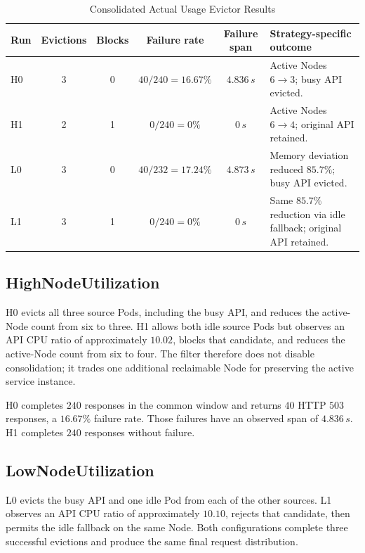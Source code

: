 \begin{table}[t]
    \centering
    \caption{Consolidated Actual Usage Evictor Results}
    \label{tab:consolidated_results}
    \small
    \renewcommand{\arraystretch}{1.18}
    \begin{tabular}{@{}lccccp{6.0cm}@{}}
        \toprule
        \textbf{Run} & \textbf{Evictions} & \textbf{Blocks} &
        \textbf{Failure rate} & \textbf{Failure span} &
        \textbf{Strategy-specific outcome} \\
        \midrule
        H0 & 3 & 0 & \(40/240=16.67\%\) & \(4.836\,s\) &
        Active Nodes \(6\to3\); busy API evicted. \\
        H1 & 2 & 1 & \(0/240=0\%\) & \(0\,s\) &
        Active Nodes \(6\to4\); original API retained. \\
        L0 & 3 & 0 & \(40/232=17.24\%\) & \(4.873\,s\) &
        Memory deviation reduced \(85.7\%\); busy API evicted. \\
        L1 & 3 & 1 & \(0/240=0\%\) & \(0\,s\) &
        Same \(85.7\%\) reduction via idle fallback; original API retained. \\
        \bottomrule
    \end{tabular}
\end{table}

\subsection{HighNodeUtilization}

H0 evicts all three source Pods, including the busy API, and reduces the
active-Node count from six to three. H1 allows both idle source Pods but
observes an API CPU ratio of approximately \(10.02\), blocks that candidate,
and reduces the active-Node count from six to four. The filter therefore does
not disable consolidation; it trades one additional reclaimable Node for
preserving the active service instance.

H0 completes \(240\) responses in the common window and returns \(40\) HTTP
\(503\) responses, a \(16.67\%\) failure rate. Those failures have an observed
span of \(4.836\,s\). H1 completes \(240\) responses without failure.

\subsection{LowNodeUtilization}

L0 evicts the busy API and one idle Pod from each of the other sources. L1
observes an API CPU ratio of approximately \(10.10\), rejects that candidate,
then permits the idle fallback on the same Node. Both configurations complete
three successful evictions and produce the same final request distribution.

